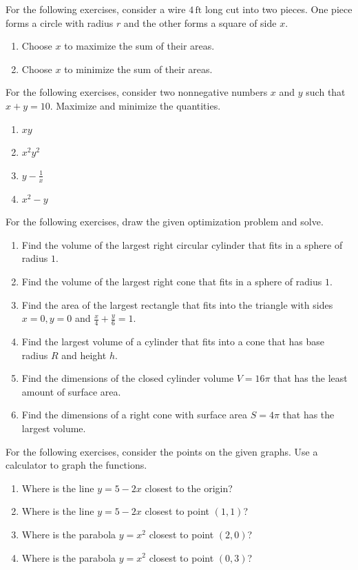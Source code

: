 \documentclass{exercises}
\begin{document}
For the following exercises, consider a wire $4\,\text{ft}$ long cut into two pieces. One piece forms a circle with radius $r$ and the other forms a square of side $x$.

\begin{enumerate}[resume]
\item Choose $x$ to maximize the sum of their areas.
\item Choose $x$ to minimize the sum of their areas.
\end{enumerate}

For the following exercises, consider two nonnegative numbers $x$ and $y$ such that $x+y=10$. Maximize and minimize the quantities.

\begin{enumerate}[resume]
\item $xy$
\item $x^{2}y^{2}$
\item $y-\frac{1}{x}$
\item $x^{2}-y$
\end{enumerate}

For the following exercises, draw the given optimization problem and solve.

\begin{enumerate}[resume]
\item Find the volume of the largest right circular cylinder that fits in a sphere of radius $1$.
\item Find the volume of the largest right cone that fits in a sphere of radius $1$.
\item Find the area of the largest rectangle that fits into the triangle with sides $x=0,y=0$ and $\frac{x}{4}+\frac{y}{6}=1$.
\item Find the largest volume of a cylinder that fits into a cone that has base radius $R$ and height $h$.
\item Find the dimensions of the closed cylinder volume $V=16\pi$ that has the least amount of surface area.
\item Find the dimensions of a right cone with surface area $S=4\pi$ that has the largest volume.
\end{enumerate}

For the following exercises, consider the points on the given graphs. Use a calculator to graph the functions.

\begin{enumerate}[resume]
\item \techrequired Where is the line $y=5-2x$ closest to the origin?
\item \techrequired Where is the line $y=5-2x$ closest to point $(1,1)$?
\item \techrequired Where is the parabola $y=x^{2}$ closest to point $(2,0)$?
\item \techrequired Where is the parabola $y=x^{2}$ closest to point $(0,3)$?
\end{enumerate}
\end{document}
